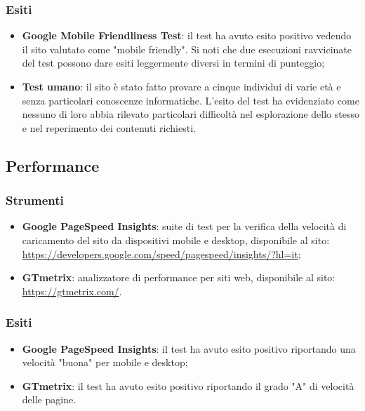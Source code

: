 \documentclass[12pt]{article}
\begin{document}
	\subsubsection{Esiti}
	
	\begin{itemize}
		\item \textbf{Google Mobile Friendliness Test}: il test ha avuto esito positivo vedendo il sito valutato come "mobile friendly". Si noti che due esecuzioni ravvicinate del test possono dare esiti leggermente diversi in termini di punteggio;
		
		\item \textbf{Test umano}: il sito è stato fatto provare a cinque individui di varie età e senza particolari conoscenze informatiche. L'esito del test ha evidenziato come nessuno di loro abbia rilevato particolari difficoltà nel esplorazione dello stesso e nel reperimento dei contenuti richiesti. 
	\end{itemize}
	
	\subsection{Performance}
	
	\subsubsection{Strumenti}
	
	\begin{itemize}
		\item \textbf{Google PageSpeed Insights}: suite di test per la verifica della velocità di caricamento del sito da dispositivi mobile e desktop, disponibile al sito:
		\\ \url{https://developers.google.com/speed/pagespeed/insights/?hl=it};
		
		\item \textbf{GTmetrix}: analizzatore di performance per siti web, disponibile al sito:
		\\ \url{https://gtmetrix.com/}.
	\end{itemize}
	
	\subsubsection{Esiti}
	
	\begin{itemize}
		\item \textbf{Google PageSpeed Insights}: il test ha avuto esito positivo riportando una velocità "buona" per mobile e desktop;
		
		\item \textbf{GTmetrix}: il test ha avuto esito positivo riportando il grado "A" di velocità delle pagine. 
	\end{itemize}
\end{document}
